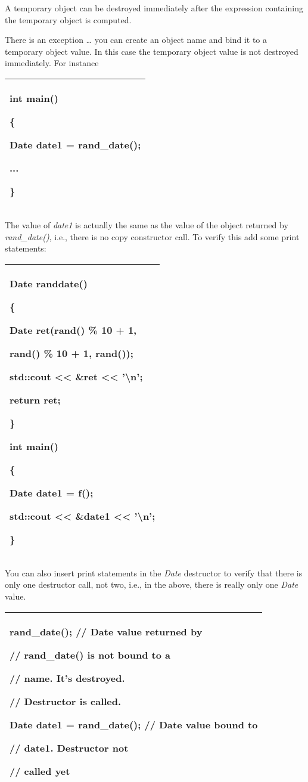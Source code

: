 \documentclass[
]{article}
\begin{document}
A temporary object can be destroyed immediately after the expression
containing the temporary object is computed.

There is an exception \ldots{} you can create an object name and bind it
to a temporary object value. In this case the temporary object value is
not destroyed immediately. For instance

\begin{longtable}[]{@{}l@{}}
\toprule
\endhead
\begin{minipage}[t]{0.97\columnwidth}\raggedright
int main()

\{

Date date1 = rand\_date();

...

\}\strut
\end{minipage}\tabularnewline
\bottomrule
\end{longtable}

The value of \emph{date1} is actually the same as the value of the
object returned by \emph{rand\_date()}, i.e., there is no copy
constructor call. To verify this add some print statements:

\begin{longtable}[]{@{}l@{}}
\toprule
\endhead
\begin{minipage}[t]{0.97\columnwidth}\raggedright
Date randdate()

\{

Date ret(rand() \% 10 + 1,

rand() \% 10 + 1, rand());

std::cout \textless\textless{} \&ret \textless\textless{}
'\textbackslash n';

return ret;

\}

int main()

\{

Date date1 = f();

std::cout \textless\textless{} \&date1 \textless\textless{}
'\textbackslash n';

\}\strut
\end{minipage}\tabularnewline
\bottomrule
\end{longtable}

You can also insert print statements in the \emph{Date} destructor to
verify that there is only one destructor call, not two, i.e., in the
above, there is really only one \emph{Date} value.

\begin{longtable}[]{@{}l@{}}
\toprule
\endhead
\begin{minipage}[t]{0.97\columnwidth}\raggedright
rand\_date(); // Date value returned by

// rand\_date() is not bound to a

// name. It's destroyed.

// Destructor is called.

Date date1 = rand\_date(); // Date value bound to

// date1. Destructor not

// called yet \strut
\end{minipage}\tabularnewline
\bottomrule
\end{longtable}
\end{document}
